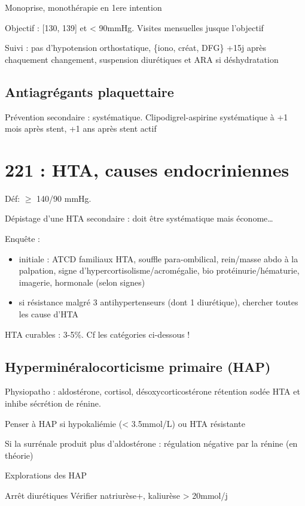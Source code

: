 \documentclass[11pt]{article}
\begin{document}
Monoprise, monothérapie en 1ere intention

Objectif : [130, 139] et < 90mmHg. Visites mensuelles jusque l'objectif

Suivi : pas d'hypotension orthostatique, \{iono, créat, DFG\} +15j après
chaquement changement, suspension diurétiques et ARA si déshydratation

\subsection{Antiagrégants plaquettaire}
\label{sec:org3a5d332}
Prévention secondaire : systématique. Clipodigrel-aspirine systématique à +1 mois
après stent, +1 ans après stent actif

\section{221 : HTA, causes endocriniennes}
\label{sec:org78342e0}
Déf: \(\ge\) 140/90 mmHg.

Dépistage d'une HTA secondaire : doit être systématique mais économe\ldots{}

Enquête :
\begin{itemize}
\item initiale : ATCD familiaux HTA, souffle para-ombilical, rein/masse abdo à la
palpation, signe d'hypercortisolisme/acromégalie, bio \thus
protéinurie/hématurie, imagerie, hormonale (selon signes)
\item si résistance malgré 3 antihypertenseurs (dont 1 diurétique), chercher toutes
les cause d'HTA
\end{itemize}

HTA curables : 3-5\%. Cf les catégories ci-dessous !

\subsection{Hyperminéralocorticisme primaire (HAP)}
\label{sec:org8f17d75}
Physiopatho : aldostérone, cortisol, désoxycorticostérone \thus rétention sodée
\thus HTA et inhibe sécrétion de rénine.

Penser à HAP si hypokaliémie (< 3.5mmol/L) ou HTA résistante

\begin{tcolorbox}
Si la surrénale produit plus d'aldostérone : régulation négative par la rénine (en théorie)
\end{tcolorbox}

\begin{algorithm}
  \caption{Explorations des HAP}
  Arrêt diurétiques\;
  Vérifier natriurèse+, kaliurèse > 20mmol/j\;
\end{algorithm}
\end{document}
